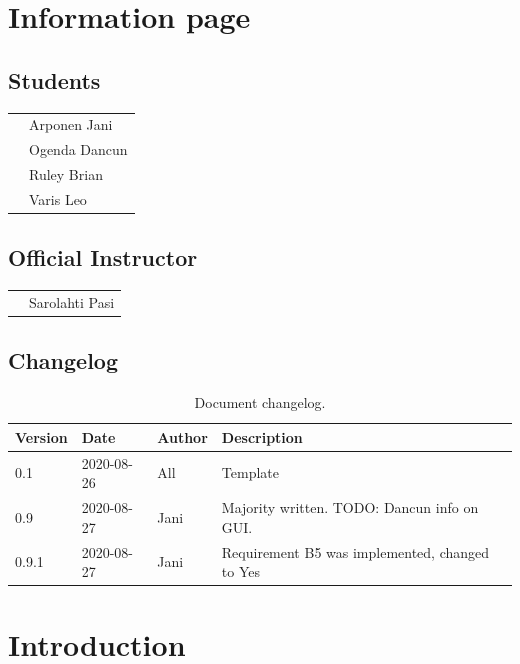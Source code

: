 \section{Information page}
\subsection*{Students}
\begin{tabular}{ll}
   & Arponen Jani \\
   & Ogenda Dancun \\
   & Ruley Brian \\
   & Varis Leo \\
\end{tabular}

\subsection*{Official Instructor}
\begin{tabular}{ll}
   & Sarolahti Pasi \\
\end{tabular}



\subsection*{Changelog}
\begin{table}[!h]
\small{
\begin{tabular}{l|l|l|l}
\textbf{Version} & \textbf{Date} & \textbf{Author} & \textbf{Description} \\
\hline
0.1 & 2020-08-26 & All & Template \\
0.9 & 2020-08-27 & Jani & Majority written. TODO: Dancun info on GUI.\\
0.9.1 & 2020-08-27 & Jani & Requirement B5 was implemented, changed to Yes \\ 
\end{tabular}
}
\caption{Document changelog.}
\label{table:changelog}
\end{table}


\newpage 
\tableofcontents

\newpage
\section{Introduction} 

